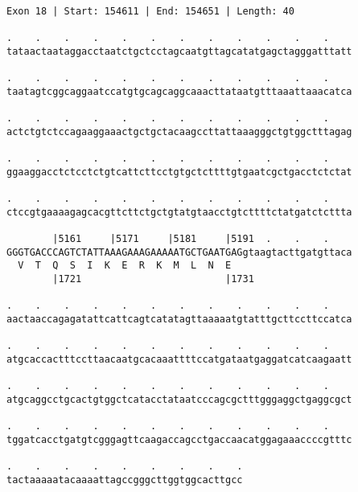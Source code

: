 \documentclass{article}
\begin{document}
\begin{Verbatim}
Exon 18 | Start: 154611 | End: 154651 | Length: 40
 
.    .    .    .    .    .    .    .    .    .    .    .    
tataactaataggacctaatctgctcctagcaatgttagcatatgagctagggatttatt
  
.    .    .    .    .    .    .    .    .    .    .    .    
taatagtcggcaggaatccatgtgcagcaggcaaacttataatgtttaaattaaacatca
  
.    .    .    .    .    .    .    .    .    .    .    .    
actctgtctccagaaggaaactgctgctacaagccttattaaagggctgtggctttagag
  
.    .    .    .    .    .    .    .    .    .    .    .    
ggaaggacctctcctctgtcattcttcctgtgctcttttgtgaatcgctgacctctctat
  
.    .    .    .    .    .    .    .    .    .    .    .    
ctccgtgaaaagagcacgttcttctgctgtatgtaacctgtcttttctatgatctcttta
  
        |5161     |5171     |5181     |5191  .    .    .    
GGGTGACCCAGTCTATTAAAGAAAGAAAAATGCTGAATGAGgtaagtacttgatgttaca
  V  T  Q  S  I  K  E  R  K  M  L  N  E                     
        |1721                         |1731                 
  
.    .    .    .    .    .    .    .    .    .    .    .    
aactaaccagagatattcattcagtcatatagttaaaaatgtatttgcttccttccatca
  
.    .    .    .    .    .    .    .    .    .    .    .    
atgcaccactttccttaacaatgcacaaattttccatgataatgaggatcatcaagaatt
  
.    .    .    .    .    .    .    .    .    .    .    .    
atgcaggcctgcactgtggctcatacctataatcccagcgctttgggaggctgaggcgct
  
.    .    .    .    .    .    .    .    .    .    .    .    
tggatcacctgatgtcgggagttcaagaccagcctgaccaacatggagaaaccccgtttc
  
.    .    .    .    .    .    .    .    .
tactaaaaatacaaaattagccgggcttggtggcacttgcc
\end{Verbatim}
\newpage
\end{document}
